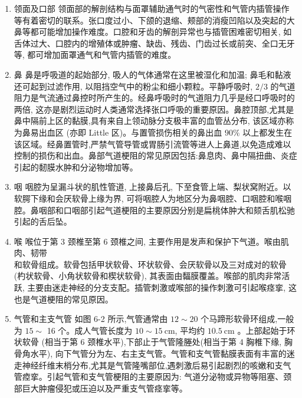 \documentclass[10pt]{article}
\begin{document}
\begin{enumerate}
  \item 领面及口部 领面部的解剖结构与面罩辅助通气时的气密性和气管内插管操作等有着密切的联系。张口度过小、下颌的退缩、颊部的消瘦凹陷以及突起的大鼻等都可能增加操作难度。口腔和牙齿的解剖异常也与插管困难密切相关, 如舌体过大、口腔内的增殖体或肿瘤、缺齿、残齿、门齿过长或前突、全口无牙等, 都可增加面罩通气和气管内插管的难度。

  \item 鼻 鼻是呼吸道的起始部分, 吸人的气体通常在这里被湿化和加温; 鼻毛和黏液还可起到过滤作用, 以阻挡空气中的粉尘和细小颗粒。平静呼吸时, $2 / 3$ 的气道阻力是气流通过鼻控时所产生的。经鼻呼吸时的气道阻力几乎是经口呼吸时的两倍, 这亦是剧烈运动时人类通常选择张口呼吸的重要原因。鼻腔顶部,尤其是鼻中隔前上区的黏膜,具有来自上领动脉分支极丰富的血管丛分布, 该区域亦称为鼻易出血区 (亦即 Little 区)。与置管损伤相关的鼻出血 $90 \%$ 以上都发生在该区域。经鼻置管时,严禁气管导管或胃肠引流管等进人上鼻道,以免造成难以控制的损伤和出血。鼻部气道梗阻的常见原因包括:鼻息肉、鼻中隔扭曲、炎症引起的䵑膜水肿和分泌物增加等。

  \item 咽 咽腔为呈漏斗状的肌性管道, 上接鼻后孔, 下至食管上端、梨状窝附近。以软腭下缘和会厌软骨上缘为界, 可将咽腔人为地区分为鼻咽腔、口咽腔和喉咽腔。鼻咽部和口咽部引起气道梗阻的主要原因分别是扁桃体肿大和颏舌肌松驰引起的舌后坠。

  \item 喉 喉位于第 3 颈椎至第 6 颈椎之间, 主要作用是发声和保护下气道。喉由肌肉、韧带\\
和软骨组成。软骨包括甲状软骨、环状软骨、会厌软骨以及三对成对的软骨 (杓状软骨、小角状软骨和楔状软骨), 其表面由䵗膜覆盖。喉部的肌肉非常活跃, 主要由迷走神经的分支支配。插管刺激或喉部的操作刺激可引起喉痉挛, 这也是气道梗阻的常见原因。

  \item 气管和主支气管 如图 6-2 所示,气管通常由 $12 \sim 20$ 个马蹄形软骨环组成,一般为 $15 \sim$ 16 个。成人气管长度为 $10 \sim 15 \mathrm{~cm}$, 平均约 $10.5 \mathrm{~cm}$ 。上部起始于环状软骨 (相当于第 6 颈椎水平),下部止于气管隆塍处(相当于第 4 胸椎下缘, 胸骨角水平), 向下气管分为左、右主支气管。气管和支气管黏膜表面有丰富的迷走神经纤维末梢分布,尤其是气管隆嘴部位,遇刺激后易引起剧烈的咳嫩和支气管㾤挛。引起气管和支气管梗阻的主要原因为: 气道分泌物或异物等阻塞、颈部巨大肿瘤侵犯或压迫以及严重支气管痉挛等。

\end{enumerate}
\end{document}

